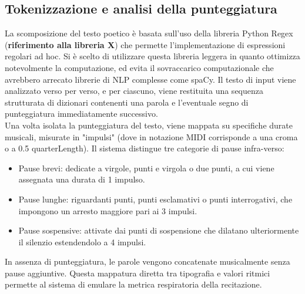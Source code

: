 \subsection{Tokenizzazione e analisi della punteggiatura}
La scomposizione del testo poetico è basata sull'uso della libreria Python Regex (\textbf{riferimento alla libreria X}) che permette l'implementazione 
di espressioni regolari ad hoc. Si è scelto di utilizzare questa libreria leggera in quanto ottimizza notevolmente la computazione, ed evita il sovraccarico 
computazionale che avrebbero arrecato librerie di NLP complesse come spaCy. Il testo di input viene analizzato verso per verso,  e per ciascuno, viene 
restituita una sequenza strutturata di dizionari contenenti una parola e l'eventuale segno di punteggiatura immediatamente successivo.\\
Una volta isolata la punteggiatura del testo, viene mappata su specifiche durate musicali, misurate in "impulsi" (dove in notazione MIDI corrisponde 
a una croma o a 0.5 quarterLength). Il sistema distingue tre categorie di pause infra-verso:
\begin{itemize}
      \item Pause brevi: dedicate a virgole, punti e virgola o due punti, a cui viene assegnata una durata di 1 impulso.
      \item Pause lunghe: riguardanti punti,  punti esclamativi o punti interrogativi, che impongono un arresto maggiore pari ai 3 impulsi.
      \item Pause sospensive: attivate dai punti di sospensione che dilatano ulteriormente il silenzio estendendolo a 4 impulsi.
\end{itemize}
In assenza di punteggiatura, le parole vengono concatenate musicalmente senza pause aggiuntive. Questa mappatura diretta tra tipografia e valori 
ritmici permette al sistema di emulare la metrica respiratoria della recitazione.

